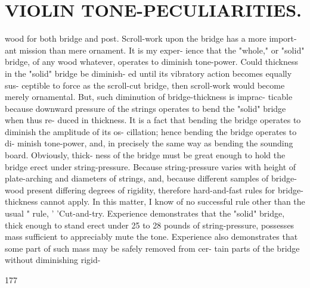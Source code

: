 \documentclass{article}
\begin{document}
\section*{VIOLIN TONE-PECULIARITIES.}
wood for both bridge and post. Scroll-work upon the bridge has a more import- ant mission than mere ornament. It is my exper- ience that the "whole," or "solid" bridge, of any wood whatever, operates to diminish tone-power. Could thickness in the "solid" bridge be diminish- ed until its vibratory action becomes equally sus- ceptible to force as the scroll-cut bridge, then scroll-work would become merely ornamental. But, such diminution of bridge-thickness is imprac- ticable because downward pressure of the strings operates to bend the "solid" bridge when thus re- duced in thickness. It is a fact that bending the bridge operates to diminish the amplitude of its os- cillation; hence bending the bridge operates to di- minish tone-power, and, in precisely the same way as bending the sounding board. Obviously, thick- ness of the bridge must be great enough to hold the bridge erect under string-pressure. Because string-pressure varies with height of plate-arching and diameters of strings, and, because different samples of bridge-wood present differing degrees of rigidity, therefore hard-and-fast rules for bridge-thickness cannot apply. In this matter, I know of no successful rule other than the usual " rule, ' 'Cut-and-try. Experience demonstrates that the "solid" bridge, thick enough to stand erect under 25 to 28 pounds of string-pressure, possesses mass sufficient to appreciably mute the tone. Experience also demonstrates that some part of such mass may be safely removed from cer- tain parts of the bridge without diminishing rigid-

177
\end{document}
